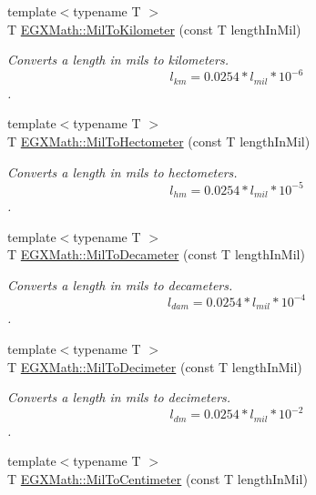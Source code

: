 \begin{DoxyCompactItemize}
{\footnotesize template$<$typename T $>$ }\\T \mbox{\hyperlink{group___e_g_x_math-_conversions-_length_conversions-_imperial-_mil-_s_i_gac5c7770c3ef34ea18bb8ff86c7093621}{E\+G\+X\+Math\+::\+Mil\+To\+Kilometer}} (const T length\+In\+Mil)
\begin{DoxyCompactList}\small\item\em Converts a length in mils to kilometers. \[ l_{km}=0.0254 * l_{mil} * 10^{-6}\]. \end{DoxyCompactList}\item 
{\footnotesize template$<$typename T $>$ }\\T \mbox{\hyperlink{group___e_g_x_math-_conversions-_length_conversions-_imperial-_mil-_s_i_ga433a3360f7bf01c5c347b9d3ba3074a5}{E\+G\+X\+Math\+::\+Mil\+To\+Hectometer}} (const T length\+In\+Mil)
\begin{DoxyCompactList}\small\item\em Converts a length in mils to hectometers. \[ l_{hm}=0.0254* l_{mil} * 10^{-5} \]. \end{DoxyCompactList}\item 
{\footnotesize template$<$typename T $>$ }\\T \mbox{\hyperlink{group___e_g_x_math-_conversions-_length_conversions-_imperial-_mil-_s_i_ga04eab639339270142a55aa2655fc0db8}{E\+G\+X\+Math\+::\+Mil\+To\+Decameter}} (const T length\+In\+Mil)
\begin{DoxyCompactList}\small\item\em Converts a length in mils to decameters. \[ l_{dam}=0.0254* l_{mil} * 10^{-4} \]. \end{DoxyCompactList}\item 
{\footnotesize template$<$typename T $>$ }\\T \mbox{\hyperlink{group___e_g_x_math-_conversions-_length_conversions-_imperial-_mil-_s_i_gadc0ea330185b0ab7569f25cbab72322d}{E\+G\+X\+Math\+::\+Mil\+To\+Decimeter}} (const T length\+In\+Mil)
\begin{DoxyCompactList}\small\item\em Converts a length in mils to decimeters. \[ l_{dm}=0.0254* l_{mil} * 10^{-2} \]. \end{DoxyCompactList}\item 
{\footnotesize template$<$typename T $>$ }\\T \mbox{\hyperlink{group___e_g_x_math-_conversions-_length_conversions-_imperial-_mil-_s_i_ga8356e73011f6f7eb1df5e3dda75d7e28}{E\+G\+X\+Math\+::\+Mil\+To\+Centimeter}} (const T length\+In\+Mil)

\end{DoxyCompactItemize}
